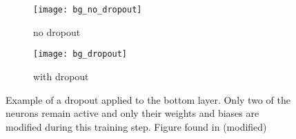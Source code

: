 \begin{figure}[H]
\centering
\begin{subfigure}{.5\textwidth}
    \centering
    \texttt{[image: bg\_no\_dropout]}
    \caption{no dropout}
    \label{}
\end{subfigure}%
\begin{subfigure}{.5\textwidth}
    \centering
    \texttt{[image: bg\_dropout]}
    \caption{with dropout}
    \label{}
\end{subfigure}
\caption{Example of a dropout applied to the bottom layer. Only two of the neurons remain active and only their weights and biases are modified during this training step. Figure found in \cite{Srivastava2014} (modified)}
\label{fig:bg:dropout}
\end{figure}
